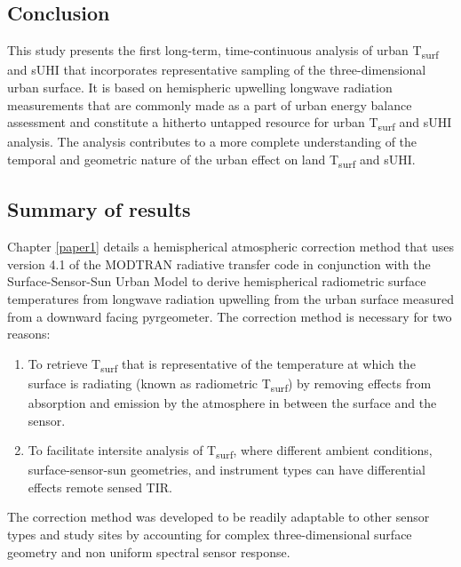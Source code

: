 \begin{bibunit}

\rhead{\thepage}

\chapter{Conclusion}

This study presents the first long-term, time-continuous analysis of urban T\textsubscript{surf} and sUHI that incorporates representative sampling of the three-dimensional urban surface. It is based on hemispheric upwelling longwave radiation measurements that are commonly made as a part of urban energy balance assessment and constitute a hitherto untapped resource for urban T\textsubscript{surf} and sUHI analysis. The analysis contributes to a more complete understanding of the temporal and geometric nature of the urban effect on land T\textsubscript{surf} and sUHI. 

\section{Summary of results}

Chapter \ref{paper1} details a hemispherical atmospheric correction method that uses version 4.1 of the MODTRAN radiative transfer code \citep{Berk1987} in conjunction with the Surface-Sensor-Sun Urban Model \citep{Soux2004} to derive hemispherical radiometric surface temperatures from longwave radiation upwelling from the urban surface measured from a downward facing pyrgeometer. The correction method is necessary for two reasons:

\begin{enumerate}
	\item To retrieve T\textsubscript{surf} that is representative of the temperature at which the surface is radiating (known as radiometric T\textsubscript{surf}) by removing effects from absorption and emission by the atmosphere in between the surface and the sensor.
	\item To facilitate intersite analysis of T\textsubscript{surf}, where different ambient conditions, surface-sensor-sun geometries, and instrument types can have differential effects remote sensed TIR.
\end{enumerate}

 The correction method was developed to be readily adaptable to other sensor types and study sites by accounting for complex three-dimensional surface geometry and non uniform spectral sensor response. 


\end{bibunit}
